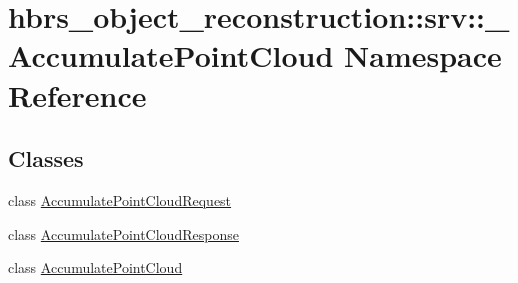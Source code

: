 \hypertarget{namespacehbrs__object__reconstruction_1_1srv_1_1___accumulate_point_cloud}{\section{hbrs\-\_\-object\-\_\-reconstruction\-:\-:srv\-:\-:\-\_\-\-Accumulate\-Point\-Cloud \-Namespace \-Reference}
\label{namespacehbrs__object__reconstruction_1_1srv_1_1___accumulate_point_cloud}
}
\subsection*{\-Classes}
\begin{DoxyCompactItemize}
\item 
class \hyperlink{classhbrs__object__reconstruction_1_1srv_1_1___accumulate_point_cloud_1_1_accumulate_point_cloud_request}{\-Accumulate\-Point\-Cloud\-Request}
\item 
class \hyperlink{classhbrs__object__reconstruction_1_1srv_1_1___accumulate_point_cloud_1_1_accumulate_point_cloud_response}{\-Accumulate\-Point\-Cloud\-Response}
\item 
class \hyperlink{classhbrs__object__reconstruction_1_1srv_1_1___accumulate_point_cloud_1_1_accumulate_point_cloud}{\-Accumulate\-Point\-Cloud}
\end{DoxyCompactItemize}
